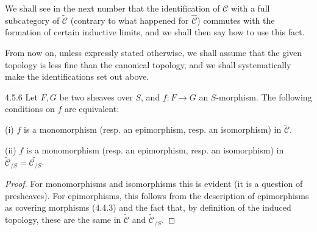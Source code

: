 We shall see in the next number that the identification of
\(\mathcal C\) with a full subcategory of \(\widetilde{\mathcal C}\)
(contrary to what happened for \(\widehat{\mathcal C}\)) commutes
with the formation of certain inductive limits, and we shall
then say how to use this fact.

From now on, unless expressly stated otherwise, we shall assume
that the given topology is less fine than the canonical topology,
and we shall systematically make the identifications set out above.

\begin{proposition}{4.5.6}\label{IV.4.5.6}
Let \(F,G\) be two sheaves over \(S\), and \(f:F\to G\) an
\(S\)-morphism. The following conditions on \(f\) are equivalent:

(i) \(f\) is a monomorphism (resp. an epimorphism, resp. an
isomorphism) in \(\widetilde{\mathcal C}\).

(ii) \(f\) is a monomorphism (resp. an epimorphism, resp. an
isomorphism) in
\(\widetilde{\mathcal C}_{/S}=\widetilde{\mathcal C_{/S}}\).
\end{proposition}
\begin{proof}
For monomorphisms and isomorphisms this is evident (it is a
question of presheaves). For epimorphisms, this follows from
the description of epimorphisms as covering morphisms (4.4.3)
and the fact that, by definition of the induced topology,
these are the same in \(\widetilde{\mathcal C}\) and
\(\widetilde{\mathcal C}_{/S}\).
\end{proof}

